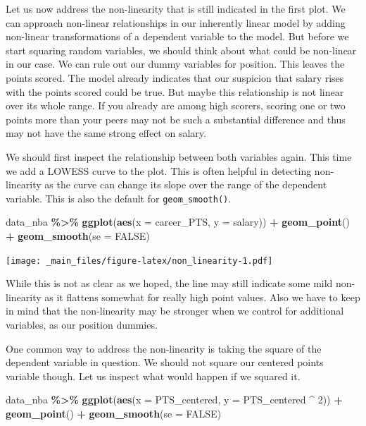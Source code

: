 \documentclass[
]{book}
\newenvironment{Shaded}{\begin{snugshade}}{\end{snugshade}}
\newcommand{\AttributeTok}[1]{\textcolor[rgb]{0.13,0.29,0.53}{#1}}
\newcommand{\ConstantTok}[1]{\textcolor[rgb]{0.56,0.35,0.01}{#1}}
\newcommand{\DecValTok}[1]{\textcolor[rgb]{0.00,0.00,0.81}{#1}}
\newcommand{\FunctionTok}[1]{\textcolor[rgb]{0.13,0.29,0.53}{\textbf{#1}}}
\newcommand{\NormalTok}[1]{#1}
\newcommand{\SpecialCharTok}[1]{\textcolor[rgb]{0.81,0.36,0.00}{\textbf{#1}}}
\begin{document}
Let us now address the non-linearity that is still indicated in the
first plot. We can approach non-linear relationships in our inherently
linear model by adding non-linear transformations of a dependent
variable to the model. But before we start squaring random variables, we
should think about what could be non-linear in our case. We can rule out
our dummy variables for position. This leaves the points scored. The
model already indicates that our suspicion that salary rises with the
points scored could be true. But maybe this relationship is not linear
over its whole range. If you already are among high scorers, scoring one
or two points more than your peers may not be such a substantial
difference and thus may not have the same strong effect on salary.

We should first inspect the relationship between both variables again.
This time we add a LOWESS curve to the plot. This is often helpful in
detecting non-linearity as the curve can change its slope over the range
of the dependent variable. This is also the default for \texttt{geom\_smooth()}.

\begin{Shaded}
\begin{Highlighting}[]
\NormalTok{data\_nba }\SpecialCharTok{\%\textgreater{}\%} 
  \FunctionTok{ggplot}\NormalTok{(}\FunctionTok{aes}\NormalTok{(}\AttributeTok{x =}\NormalTok{ career\_PTS, }\AttributeTok{y =}\NormalTok{ salary)) }\SpecialCharTok{+}
  \FunctionTok{geom\_point}\NormalTok{() }\SpecialCharTok{+}
  \FunctionTok{geom\_smooth}\NormalTok{(}\AttributeTok{se =} \ConstantTok{FALSE}\NormalTok{)}
\end{Highlighting}
\end{Shaded}

\texttt{[image: \_main\_files/figure-latex/non\_linearity-1.pdf]}

While this is not as clear as we hoped, the line may still indicate some
mild non-linearity as it flattens somewhat for really high point values.
Also we have to keep in mind that the non-linearity may be stronger when
we control for additional variables, as our position dummies.

One common way to address the non-linearity is taking the square of the
dependent variable in question. We should not square our centered points
variable though. Let us inspect what would happen if we squared it.

\begin{Shaded}
\begin{Highlighting}[]
\NormalTok{data\_nba }\SpecialCharTok{\%\textgreater{}\%} 
  \FunctionTok{ggplot}\NormalTok{(}\FunctionTok{aes}\NormalTok{(}\AttributeTok{x =}\NormalTok{ PTS\_centered, }\AttributeTok{y =}\NormalTok{ PTS\_centered }\SpecialCharTok{\^{}} \DecValTok{2}\NormalTok{)) }\SpecialCharTok{+}
  \FunctionTok{geom\_point}\NormalTok{() }\SpecialCharTok{+}
  \FunctionTok{geom\_smooth}\NormalTok{(}\AttributeTok{se =} \ConstantTok{FALSE}\NormalTok{)}
\end{Highlighting}
\end{Shaded}
\end{document}
